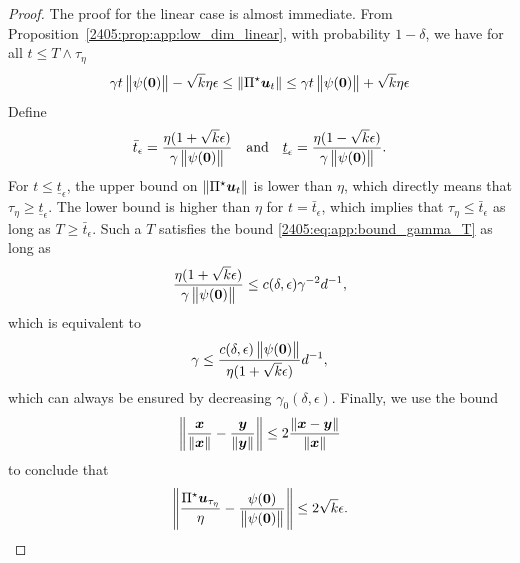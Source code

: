 \begin{proof}
    The proof for the linear case is almost immediate. From Proposition~\ref{2405:prop:app:low_dim_linear}, with probability $1 - \delta$, we have for all $t \leq T \wedge \tau_\eta$
    \[ \gamma t \left\lVert \psi({\boldsymbol{0}})\right\rVert - \sqrt{k}\eta\epsilon \leq \left\lVert \Pi^\star{\boldsymbol{u}}_t\right\rVert \leq \gamma t \left\lVert \psi({\boldsymbol{0}})\right\rVert + \sqrt{k}\eta\epsilon \]
    Define
    \[ \bar t_\epsilon = \frac{\eta(1 + \sqrt{k}\epsilon)}{\gamma \left\lVert \psi({\boldsymbol{0}})\right\rVert} \quad \text{and} \quad \underline t_\epsilon = \frac{\eta(1 - \sqrt{k}\epsilon)}{\gamma \left\lVert \psi({\boldsymbol{0}})\right\rVert}. \]
    For $t \leq \underline t_\epsilon$, the upper bound on $\left\lVert \Pi^\star {\boldsymbol{u}}_t\right\rVert$ is lower than $\eta$, which directly means that $\tau_\eta \geq \underline t_\epsilon$. The lower bound is higher than $\eta$ for $t = \bar t_\epsilon$, which implies that $\tau_\eta \leq \bar t_\epsilon$ as long as $T \geq \bar t_\epsilon$. Such a $T$ satisfies the bound \eqref{2405:eq:app:bound_gamma_T} as long as
    \[ \frac{\eta(1 + \sqrt{k}\epsilon)}{\gamma \left\lVert \psi({\boldsymbol{0}})\right\rVert} \leq c(\delta, \epsilon) \gamma^{-2}d^{-1}, \]
    which is equivalent to
    \[ \gamma \leq \frac{c(\delta,\epsilon)\left\lVert \psi({\boldsymbol{0}})\right\rVert}{\eta(1 + \sqrt{k}\epsilon)}  d^{-1},\]
    which can always be ensured by decreasing $\gamma_0(\delta, \epsilon)$. Finally, we use the bound
    \[ \left\lVert \frac{{\boldsymbol{x}}}{\left\lVert {\boldsymbol{x}}\right\rVert} - \frac{{\boldsymbol{y}}}{\left\lVert {\boldsymbol{y}}\right\rVert}\right\rVert \leq 2 \frac{\left\lVert {\boldsymbol{x}} - {\boldsymbol{y}}\right\rVert}{\left\lVert {\boldsymbol{x}}\right\rVert} \]
    to conclude that
    \[ \left\lVert \frac{\Pi^\star {\boldsymbol{u}}_{\tau_\eta}}{\eta} - \frac{\psi({\boldsymbol{0}})}{\left\lVert \psi({\boldsymbol{0}})\right\rVert}\right\rVert \leq 2\sqrt{k}\epsilon. \]


\end{proof}
